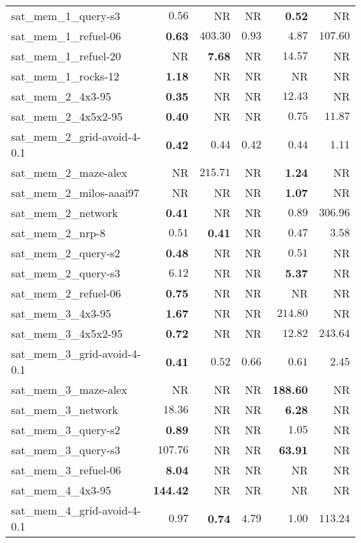 \begin{tabular}{lrrrrr}
sat\_mem\_1\_query-s3 & $0.56$ & NR & NR & \textbf{0.52} & NR \\
sat\_mem\_1\_refuel-06 & \textbf{0.63} & $403.30$ & $0.93$ & $4.87$ & $107.60$ \\
sat\_mem\_1\_refuel-20 & NR & \textbf{7.68} & NR & $14.57$ & NR \\
sat\_mem\_1\_rocks-12 & \textbf{1.18} & NR & NR & NR & NR \\
sat\_mem\_2\_4x3-95 & \textbf{0.35} & NR & NR & $12.43$ & NR \\
sat\_mem\_2\_4x5x2-95 & \textbf{0.40} & NR & NR & $0.75$ & $11.87$ \\
sat\_mem\_2\_grid-avoid-4-0.1 & \textbf{0.42} & $0.44$ & $0.42$ & $0.44$ & $1.11$ \\
sat\_mem\_2\_maze-alex & NR & $215.71$ & NR & \textbf{1.24} & NR \\
sat\_mem\_2\_milos-aaai97 & NR & NR & NR & \textbf{1.07} & NR \\
sat\_mem\_2\_network & \textbf{0.41} & NR & NR & $0.89$ & $306.96$ \\
sat\_mem\_2\_nrp-8 & $0.51$ & \textbf{0.41} & NR & $0.47$ & $3.58$ \\
sat\_mem\_2\_query-s2 & \textbf{0.48} & NR & NR & $0.51$ & NR \\
sat\_mem\_2\_query-s3 & $6.12$ & NR & NR & \textbf{5.37} & NR \\
sat\_mem\_2\_refuel-06 & \textbf{0.75} & NR & NR & NR & NR \\
sat\_mem\_3\_4x3-95 & \textbf{1.67} & NR & NR & $214.80$ & NR \\
sat\_mem\_3\_4x5x2-95 & \textbf{0.72} & NR & NR & $12.82$ & $243.64$ \\
sat\_mem\_3\_grid-avoid-4-0.1 & \textbf{0.41} & $0.52$ & $0.66$ & $0.61$ & $2.45$ \\
sat\_mem\_3\_maze-alex & NR & NR & NR & \textbf{188.60} & NR \\
sat\_mem\_3\_network & $18.36$ & NR & NR & \textbf{6.28} & NR \\
sat\_mem\_3\_query-s2 & \textbf{0.89} & NR & NR & $1.05$ & NR \\
sat\_mem\_3\_query-s3 & $107.76$ & NR & NR & \textbf{63.91} & NR \\
sat\_mem\_3\_refuel-06 & \textbf{8.04} & NR & NR & NR & NR \\
sat\_mem\_4\_4x3-95 & \textbf{144.42} & NR & NR & NR & NR \\
sat\_mem\_4\_grid-avoid-4-0.1 & $0.97$ & \textbf{0.74} & $4.79$ & $1.00$ & $113.24$ \\

\end{tabular}
